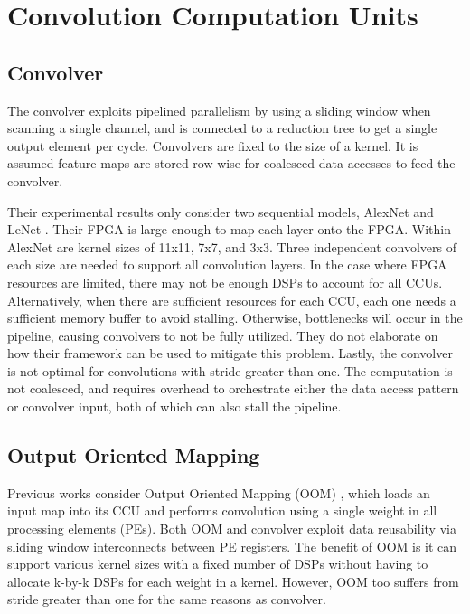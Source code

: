 \section{Convolution Computation Units}
\subsection{Convolver}
The convolver \cite{liu2016automatic} exploits pipelined parallelism by using a sliding window when scanning a single channel, and is connected to a reduction tree to get a single output element per cycle. Convolvers are fixed to the size of a kernel. It is assumed feature maps are stored row-wise for coalesced data accesses to feed the convolver.

Their experimental results only consider two sequential models, AlexNet \cite{krizhevsky2012imagenet} and LeNet \cite{lecun1998gradient}. Their FPGA is large enough to map each layer onto the FPGA. Within AlexNet are kernel sizes of 11x11, 7x7, and 3x3. Three independent convolvers of each size are needed to support all convolution layers. In the case where FPGA resources are limited, there may not be enough DSPs to account for all CCUs. Alternatively, when there are sufficient resources for each CCU, each one needs a sufficient memory buffer to avoid stalling. Otherwise, bottlenecks will occur in the pipeline, causing convolvers to not be fully utilized. They do not elaborate on how their framework can be used to mitigate this problem. Lastly, the convolver is not optimal for convolutions with stride greater than one. The computation is not coalesced, and requires overhead to orchestrate either the data access pattern or convolver input, both of which can also stall the pipeline.

\subsection{Output Oriented Mapping}
Previous works consider Output Oriented Mapping (OOM) \cite{zhang2015optimizing, chen2017eyeriss, rahman2016efficient}, which loads an input map into its CCU and performs convolution using a single weight in all processing elements (PEs). Both OOM and convolver exploit data reusability via sliding window interconnects between PE registers. The benefit of OOM is it can support various kernel sizes with a fixed number of DSPs without having to allocate k-by-k DSPs for each weight in a kernel. However, OOM too suffers from stride greater than one for the same reasons as convolver.

